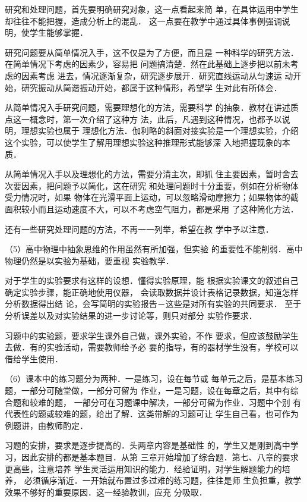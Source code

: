 研究和处理问题，首先要明确研究对象，这一点看起来简
单，在具体运用中学生却往往不能把握，造成分析上的混乱．
这一点要在教学中通过具体事例强调说明，使学生能够掌握．

研究问题要从简单情况入手，这不仅是为了方便，而且是
一种科学的研究方法．在简单情况下考虑的因素少，容易把
问题搞清楚．然在此基础上逐步把以前未考虑的因素考虑
进去，情况逐渐复杂，研究逐步展开．研究直线运动从匀速运
动开始，研究振动从简谐振动开始，都属于这种情形，希望学
生对此有所体会．

从简单情况入手研究问题，需要理想化的方法，需要科学
的抽象．教材在讲述质点这一概念时，第一次介绍了这种方
法，此后，凡遇到这种情况，也都予以说明，理想实验也属于
理想化方法．伽利略的斜面对接实验是一个理想实验，介绍
这个实验，可以使学生了解用理想实验这种推理形式能够深
入地把握现象的本质．

从简单情况入手以及理想化的方法，需要分清主次，即抓
住主要因素，暂时舍去次要因素，把问题予以简化，这在研究
和处理问题时十分重要，例如在分析物体受力情况时，如果
物体在光滑平面上运动，可以忽略滑动摩擦力；如果物体的截
面积较小而且运动速度不大，可以不考虑空气阻力，都是采用
了这种简化方法．

还有一些研究处理问题的方法，不再一一列举，希望在教
学中予以注意．

（5）高中物理中抽象思维的作用虽然有所加强，但实验
的重要性不能削弱．高中物理仍然是以实验为基础，要重视
实验教学．

对于学生的实验要求有这样的设想．懂得实验原理，能
根据实验课文的叙述自己确定实验步骤，能正确地使用仪器，
会读取数据并设计表格记录数据，知道怎样分析数据得出结
论，会写简明的实验报告－这些是对所有实验的共同要求．
至于分析误差以及对实验结果的进一步讨论等，则只对部分
实验作要求．

习题中的实验题，要求学生课外自己做，课外实验，不作
要求，但应该鼓励学生去做．有的实验活动，需要教师给予必
要的指导，有的器材学生没有，学校可以借给学生使用．

（6）课本中的练习题分为两种．一是练习，设在每节或
每单元之后，是基本练习题，一部分可随堂做，一部分可留为
作业，一是习题，设在每章之后，其中有综合题和较难的题，
一部分可在习题课中解决，一部分可留为作业．习题中个别
有代表性的题或较难的题，给出了解．这类带解的习题可让
学生自己看，也可作为例题讲，由教师酌定．

习题的安排，要求是逐步提高的．头两章内容是基础性
的，学生又是刚到高中学习，因此安排的都是基本题目．从第
三章开始增加了综合题．第七、八章的要求更高些，注意培养
学生灵活运用知识的能力．经验证明，对学生解题能力的培养，
必须循序渐近．一开始就布置过多过难的练习题，往往是师
生负担重，教学效果不够好的重要原因．这一经验教训，应充
分吸取．

